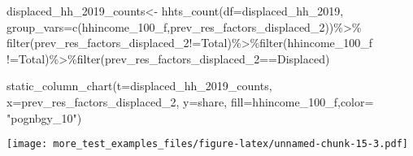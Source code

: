 \documentclass[
]{article}
\newenvironment{Shaded}{\begin{snugshade}}{\end{snugshade}}
\newcommand{\AttributeTok}[1]{\textcolor[rgb]{0.77,0.63,0.00}{#1}}
\newcommand{\FunctionTok}[1]{\textcolor[rgb]{0.00,0.00,0.00}{#1}}
\newcommand{\NormalTok}[1]{#1}
\newcommand{\OtherTok}[1]{\textcolor[rgb]{0.56,0.35,0.01}{#1}}
\newcommand{\SpecialCharTok}[1]{\textcolor[rgb]{0.00,0.00,0.00}{#1}}
\newcommand{\StringTok}[1]{\textcolor[rgb]{0.31,0.60,0.02}{#1}}
\begin{document}
\begin{Shaded}
\begin{Highlighting}[]
\NormalTok{displaced\_hh\_2019\_counts}\OtherTok{\textless{}{-}} \FunctionTok{hhts\_count}\NormalTok{(}\AttributeTok{df=}\NormalTok{displaced\_hh\_2019, }\AttributeTok{group\_vars=}\FunctionTok{c}\NormalTok{(}\StringTok{\textquotesingle{}hhincome\_100\_f\textquotesingle{}}\NormalTok{,}\StringTok{\textquotesingle{}prev\_res\_factors\_displaced\_2\textquotesingle{}}\NormalTok{))}\SpecialCharTok{\%\textgreater{}\%}
\FunctionTok{filter}\NormalTok{(prev\_res\_factors\_displaced\_2}\SpecialCharTok{!=}\StringTok{\textquotesingle{}Total\textquotesingle{}}\NormalTok{)}\SpecialCharTok{\%\textgreater{}\%}\FunctionTok{filter}\NormalTok{(hhincome\_100\_f }\SpecialCharTok{!=}\StringTok{\textquotesingle{}Total\textquotesingle{}}\NormalTok{)}\SpecialCharTok{\%\textgreater{}\%}\FunctionTok{filter}\NormalTok{(prev\_res\_factors\_displaced\_2}\SpecialCharTok{==}\StringTok{\textquotesingle{}Displaced\textquotesingle{}}\NormalTok{)}

\FunctionTok{static\_column\_chart}\NormalTok{(}\AttributeTok{t=}\NormalTok{displaced\_hh\_2019\_counts, }\AttributeTok{x=}\StringTok{\textquotesingle{}prev\_res\_factors\_displaced\_2\textquotesingle{}}\NormalTok{, }\AttributeTok{y=}\StringTok{\textquotesingle{}share\textquotesingle{}}\NormalTok{, }\AttributeTok{fill=}\StringTok{\textquotesingle{}hhincome\_100\_f\textquotesingle{}}\NormalTok{,}\AttributeTok{color=}  \StringTok{"pognbgy\_10"}\NormalTok{)}
\end{Highlighting}
\end{Shaded}

\texttt{[image: more\_test\_examples\_files/figure-latex/unnamed-chunk-15-3.pdf]}
\end{document}
